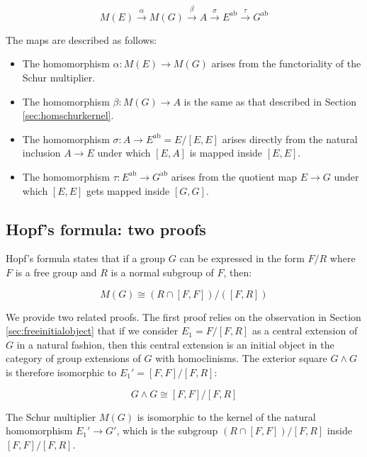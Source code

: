 \documentclass{ucetd}
\begin{document}
$$M(E) \stackrel{\alpha}{\to} M(G) \stackrel{\beta}{\to} A \stackrel{\sigma}{\to} E^{\operatorname{ab}} \stackrel{\tau}{\to} G^{\operatorname{ab}}$$

The maps are described as follows:

\begin{itemize}
\item The homomorphism $\alpha:M(E) \to M(G)$ arises from the
  functoriality of the Schur multiplier.
\item The homomorphism $\beta:M(G) \to A$ is the same as that
  described in Section \ref{sec:homschurkernel}.
\item The homomorphism $\sigma:A \to E^{\operatorname{ab}} = E/[E,E]$
  arises directly from the natural inclusion $A \to E$ under which
  $[E,A]$ is mapped inside $[E,E]$.
\item The homomorphism $\tau:E^{\operatorname{ab}} \to
  G^{\operatorname{ab}}$ arises from the quotient map $E \to G$ under
  which $[E,E]$ gets mapped inside $[G,G]$.
\end{itemize}

\subsection{Hopf's formula: two proofs}\label{sec:hopf-formula-proofs}

Hopf's formula states that if a group $G$ can be expressed in the form
$F/R$ where $F$ is a free group and $R$ is a normal subgroup of $F$, then:

\begin{equation}\label{eq:hopf-formula}
  M(G) \cong (R \cap [F,F])/([F,R])
\end{equation}

We provide two related proofs. The first proof relies on the
observation in Section \ref{sec:freeinitialobject}
that if we consider $E_1 = F/[F,R]$ as a central extension of $G$ in a
natural fashion, then this central extension is an initial object in
the category of group extensions of $G$ with homoclinisms. The
exterior square $G \wedge G$ is therefore isomorphic to $E_1' =
[F,F]/[F,R]$:

\begin{equation}\label{eq:exteriorsquare-hopf-formula}
  G \wedge G \cong [F,F]/[F,R]
\end{equation}

The Schur multiplier $M(G)$ is isomorphic to the kernel of the natural
homomorphism $E_1' \to G'$, which is the subgroup $(R \cap
[F,F])/[F,R]$ inside $[F,F]/[F,R]$.
\end{document}
